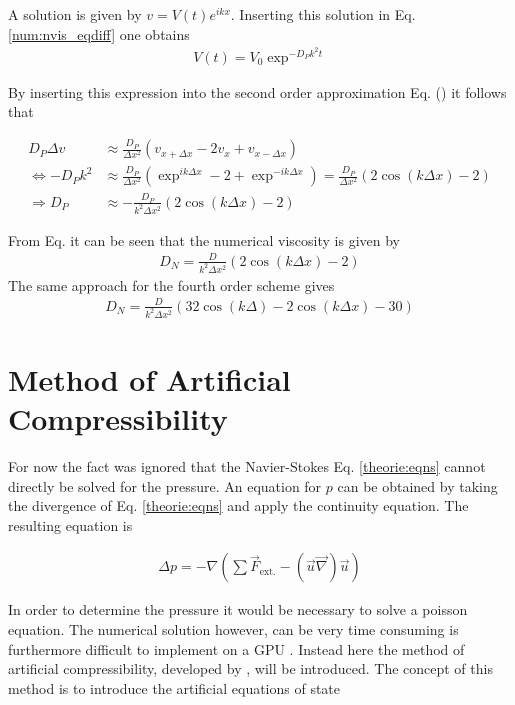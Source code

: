 A solution is given by $v = V(t)e^{ikx}$. Inserting this solution in Eq. \ref{num:nvis_eqdiff} one obtains
\begin{align}
    V(t) = V_0 \exp^{-D_Pk^2t}
\end{align}

By inserting this expression into the second order approximation Eq. () it
follows that

\begin{align}
                      D_P \Delta v  &\approx \frac{D_P}{\Delta x^2} \left(v_{x+\Delta x} - 2 v_x + v_{x - \Delta x}\right) \\
    \Leftrightarrow   -D_P k^2        &\approx \frac{D_P}{\Delta x^2} \left(\exp^{ik\Delta x} - 2 + \exp^{-ik\Delta x}\right) =   \frac{D_P}{\Delta x^2} \left(2\cos(k\Delta x) - 2\right)\\
    \Rightarrow   D_P      &\approx - \frac{D_P}{k^2 \Delta x^2} \left(2\cos(k\Delta x) - 2\right)
\end{align}

From Eq. it can be seen that the numerical viscosity is given by
\begin{align}
 \label{NUMERIC:NUMVIS}
    D_N = \frac{D}{k^2 \Delta x^2} \left(2\cos(k\Delta x) - 2\right)
\end{align}
The same approach for the fourth order scheme gives
\begin{align}
 \label{NUMERIC:NUMVIS2}
    D_N = \frac{D}{k^2 \Delta x^2} \left(32\cos(k\Delta ) - 2\cos(k\Delta x) - 30\right)
\end{align}
\clearpage



\section{Method of Artificial Compressibility}

For now the fact was ignored that the Navier-Stokes Eq. \ref{theorie:eqns} cannot directly be solved for the pressure.
An equation for $p$ can be obtained by taking the divergence of Eq. \ref{theorie:eqns} and apply the continuity equation.
The resulting equation is \citep{QUOTE}

\begin{align}
    \Delta p =  -\nabla \left( \sum \vec{F}_{\text{ext.}} - (\vec{u} \vec{\nabla}) \vec{u}\right)
\end{align}

In order to determine the pressure it would be necessary to solve a poisson equation.
The numerical solution  however, can be very time consuming is  furthermore difficult to implement on a GPU \citep{TILGNER}.
Instead here the method of artificial compressibility, developed by \citep{Chorin1997}, will be introduced.
The concept of this method is to introduce the artificial equations of state


